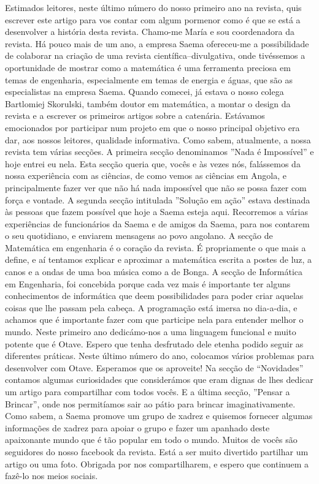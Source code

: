 \begin{multicols}{2}
  \cappar Estimados leitores, neste último número do nosso primeiro
  ano na revista, quis escrever este artigo para vos contar com algum
  pormenor como é que se está a desenvolver a história desta
  revista. Chamo-me María e sou coordenadora da revista. Há pouco mais
  de um ano, a empresa Saema ofereceu-me a possibilidade de colaborar
  na criação de uma revista científica–divulgativa, onde tivéssemos a
  oportunidade de mostrar como a matemática é uma ferramenta preciosa
  em temas de engenharia, especialmente em temas de energia e águas,
  que são as especialistas na empresa Saema. Quando comecei, já estava
  o nosso colega Bartlomiej Skorulski, também doutor em matemática, a
  montar o design da revista e a escrever os primeiros artigos sobre a
  catenária. Estávamos emocionados por participar num projeto em que o
  nosso principal objetivo era dar, aos nossos leitores, qualidade
  informativa.  Como sabem, atualmente, a nossa revista tem várias
  secções. A primeira secção denominamos ''Nada é Impossível” e hoje
  entrei eu nela. Esta secção queria que, vocês e às vezes nós,
  falássemos da nossa experiência com as ciências, de como vemos as
  ciências em Angola, e principalmente fazer ver que não há nada
  impossível que não se possa fazer com força e vontade. A segunda
  secção intitulada ''Solução em ação” estava destinada às pessoas que
  fazem possível que hoje a Saema esteja aqui. Recorremos a várias
  experiências de funcionários da Saema e de amigos da Saema, para nos
  contarem o seu quotidiano, e enviarem mensagens ao povo angolano. A
  secção de Matemática em engenharia é o coração da revista. É
  propriamente o que mais a define, e aí tentamos explicar e aproximar
  a matemática escrita a postes de luz, a canos e a ondas de uma boa
  música como a de Bonga. A secção de Informática em Engenharia, foi
  concebida porque cada vez mais é importante ter alguns conhecimentos
  de informática que deem possibilidades para poder criar aquelas
  coisas que lhe passam pela cabeça. A programação está imersa no
  dia-a-dia, e achamos que é importante fazer com que participe nela
  para entender melhor o mundo. Neste primeiro ano dedicámo-nos a uma
  linguagem funcional e muito potente que é Otave. Espero que tenha
  desfrutado dele etenha podido seguir as diferentes práticas. Neste
  último número do ano, colocamos vários problemas para desenvolver
  com Otave.  Esperamos que os aproveite! Na secção de “Novidades”
  contamos algumas curiosidades que considerámos que eram dignas de
  lhes dedicar um artigo para compartilhar com todos vocês. E a última
  secção, ''Pensar a Brincar”, onde nos permitíamos sair ao pátio para
  brincar imaginativamente.  Como sabem, a Saema promove um grupo de
  xadrez e quisemos fornecer algumas informações de xadrez para apoiar
  o grupo e fazer um apanhado deste apaixonante mundo que é tão
  popular em todo o mundo.  Muitos de vocês são seguidores do nosso
  facebook da revista. Está a ser muito divertido partilhar um artigo
  ou uma foto. Obrigada por nos compartilharem, e espero que continuem
  a fazê-lo nos meios sociais.
 

\end{multicols}
